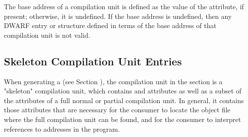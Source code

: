 The  base address of a compilation unit is defined as the
value of the \DWATlowpc{} attribute, if present; otherwise,
it is undefined. If the base address is undefined, then any
DWARF entry or structure defined in terms of the base address
of that compilation unit is not valid.

\subsection{Skeleton Compilation Unit Entries}
\label{chap:skeletoncompilationunitentries}
When generating a \splitDWARFobjectfile{} (see 
Section ), the
compilation unit in the \dotdebuginfo{} section is a "skeleton"
compilation unit, which contains \DWATdwoname{} and \DWATdwoid{}
attributes as well as a subset of the
attributes of a full normal or partial compilation unit. In general, 
it contains those attributes that are necessary for the consumer
to locate the object file where the full compilation unit
can be found, and for the consumer to interpret references to
addresses in the program. 

